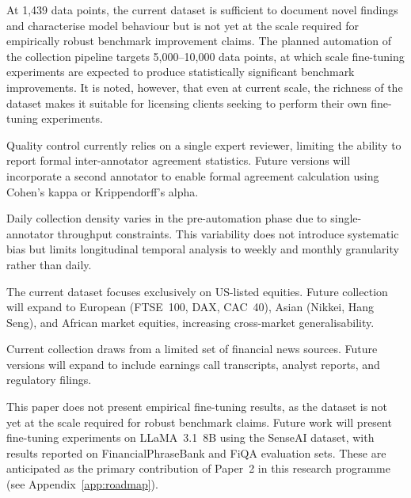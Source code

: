 \documentclass[11pt,a4paper]{article}
\begin{document}
\begin{description}[leftmargin=2em, style=nextline,
                    font=\bfseries\color{darkblue}]

  \item[Dataset scale.]
    At 1,439 data points, the current dataset is sufficient to document novel findings
    and characterise model behaviour but is not yet at the scale required for
    empirically robust benchmark improvement claims. The planned automation of the
    collection pipeline targets 5,000--10,000 data points, at which scale fine-tuning
    experiments are expected to produce statistically significant benchmark
    improvements. It is noted, however, that even at current scale, the richness of
    the dataset makes it suitable for licensing clients seeking to perform their own
    fine-tuning experiments.

  \item[Single annotator.]
    Quality control currently relies on a single expert reviewer, limiting the ability to
    report formal inter-annotator agreement statistics. Future versions will incorporate
    a second annotator to enable formal agreement calculation using Cohen's kappa
    or Krippendorff's alpha.

  \item[Collection density variability.]
    Daily collection density varies in the pre-automation phase due to
    single-annotator throughput constraints. This variability does not introduce
    systematic bias but limits longitudinal temporal analysis to weekly and monthly
    granularity rather than daily.

  \item[Geographic coverage.]
    The current dataset focuses exclusively on US-listed equities. Future collection
    will expand to European (FTSE~100, DAX, CAC~40), Asian (Nikkei, Hang Seng),
    and African market equities, increasing cross-market generalisability.

  \item[News source diversity.]
    Current collection draws from a limited set of financial news sources. Future
    versions will expand to include earnings call transcripts, analyst reports, and
    regulatory filings.

  \item[Fine-tuning benchmarks.]
    This paper does not present empirical fine-tuning results, as the dataset is not
    yet at the scale required for robust benchmark claims. Future work will present
    fine-tuning experiments on LLaMA~3.1~8B using the SenseAI dataset, with results
    reported on FinancialPhraseBank and FiQA evaluation sets. These are anticipated
    as the primary contribution of Paper~2 in this research programme
    (see Appendix~\ref{app:roadmap}).

\end{description}
\end{document}

